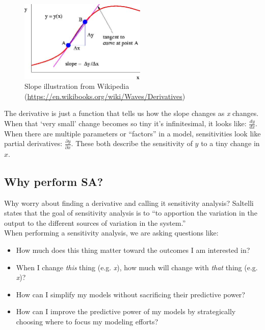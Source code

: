 \documentclass[10pt]{article}
\begin{document}
            \begin{figure}[h]
            \centering
            \includegraphics[width=6cm]{extras25/slope}
            \caption{Slope illustration from Wikipedia
            \label{slope}(\url{https://en.wikibooks.org/wiki/Waves/Derivatives})}
            \end{figure}

The derivative is just a function that tells us how the slope changes as \textit{x} changes. When that `very small' {\color{blue}change becomes} so tiny it's infinitesimal, it looks like: $\frac{d y}{d x}$. When there are multiple parameters or ``factors'' in a model, sensitivities look like partial derivatives: $\frac{\partial y}{\partial x}$. These both describe the sensitivity of $y$ to a tiny change in $x$.

\subsection{Why perform SA?}
Why worry about finding a derivative and calling it sensitivity analysis? Saltelli 
\cite{Saltelli2009-tz} states that the goal of sensitivity analysis is to ``to apportion the variation in the output to the different sources of variation in the system.''\\

When performing a sensitivity analysis, we are asking questions like:

\vspace{-6pt}
\begin{itemize}
    \setlength{\itemsep}{0pt}%
    \setlength{\parskip}{0pt}%
    \item How much does this thing matter toward the outcomes I am interested in?
    \item When I change \textit{this} thing (e.g. \textit{x}), how much will change with \textit{that} thing (e.g. \textit{x})?
        \item How can I simplify my models without sacrificing their predictive power?
    \item How can I improve the predictive power of my models by strategically choosing where to focus my modeling efforts?
\end{itemize}
\vspace{-6pt}
\end{document}
